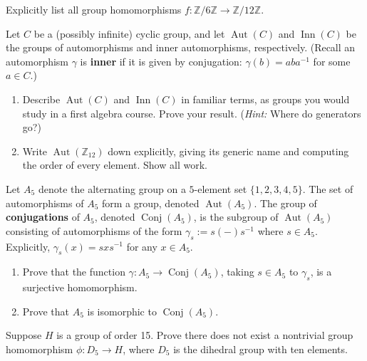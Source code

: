 \documentclass[11pt,twoside,openany]{memoir}
\begin{document}
            \begin{exercise}
            Explicitly list all group homomorphisms $f:\mathbb{Z}/6\mathbb{Z} \to \mathbb{Z}/12\mathbb{Z}$.
            \end{exercise}
            
            \begin{exercise}
            Let $C$ be a (possibly infinite) cyclic group, and let $\operatorname{Aut}(C)$ and $\operatorname{Inn}(C)$ be the groups of automorphisms and inner automorphisms, respectively. (Recall an automorphism $\gamma$ is \textbf{inner} if it is given by conjugation: $\gamma(b)=aba^{-1}$ for some $a\in C$.)
            \begin{enumerate}[label=(\alph*)]
                \item Describe $\operatorname{Aut}(C)$ and $\operatorname{Inn}(C)$ in familiar terms, as groups you would study in a first algebra course. Prove your result. (\textit{Hint:} Where do generators go?)
                \item Write $\operatorname{Aut}(\mathbb{Z}_{12})$ down explicitly, giving its generic name and computing the order of every element. Show all work.
            \end{enumerate}
            \end{exercise}
            
            \begin{exercise}
            Let $A_5$ denote the alternating group on a $5$-element set $\{1,2,3,4,5\}$. The set of automorphisms of $A_5$ form a group, denoted $\operatorname{Aut}(A_5)$. The group of \textbf{conjugations} of $A_5$, denoted $\operatorname{Conj}(A_5)$, is the subgroup of $\operatorname{Aut}(A_5)$ consisting of automorphisms of the form $\gamma_s:=s(-)s^{-1}$ where $s\in A_5$. Explicitly, $\gamma_s(x)=sxs^{-1}$ for any $x\in A_5$.
            \begin{enumerate}[label=(\alph*)]
                \item Prove that the function $\gamma:A_5\to \operatorname{Conj}(A_5)$, taking $s\in A_5$ to $\gamma_s$, is a surjective homomorphism.
                \item Prove that $A_5$ is isomorphic to $\operatorname{Conj}(A_5)$.
            \end{enumerate}
            \end{exercise}
            
            \begin{exercise}
            Suppose $H$ is a group of order 15. Prove there does not exist a nontrivial group homomorphism $\phi:D_5\to H$, where $D_5$ is the dihedral group with ten elements.
            \end{exercise}
            
\end{document}

